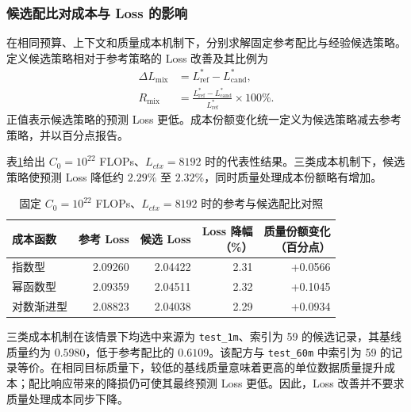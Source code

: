 \documentclass[bwprint]{gmcmthesis}
\numberwithin{equation}{section}
\numberwithin{figure}{section}
\numberwithin{table}{section}
\begin{document}
        \subsubsection{候选配比对成本与 Loss 的影响}

        在相同预算、上下文和质量成本机制下，分别求解固定参考配比与经验候选策略。定义候选策略相对于参考策略的 Loss 改善及其比例为
        \begin{equation}
        \begin{aligned}
        \Delta L_{\mathrm{mix}}
        &=L_{\mathrm{ref}}^*-L_{\mathrm{cand}}^*,\\
        R_{\mathrm{mix}}
        &=\frac{L_{\mathrm{ref}}^*-L_{\mathrm{cand}}^*}{L_{\mathrm{ref}}^*}\times100\%.
        \end{aligned}
        \label{eq:p3_mixture_improvement}
        \end{equation}
        正值表示候选策略的预测 Loss 更低。成本份额变化统一定义为候选策略减去参考策略，并以百分点报告。

        表\ref{tab:p3_mixture_comparison}给出 $C_0=10^{22}$ FLOPs、$L_{ctx}=8192$ 时的代表性结果。三类成本机制下，候选策略使预测 Loss 降低约 $2.29\%$ 至 $2.32\%$，同时质量处理成本份额略有增加。

        \begin{table}[htbp]
        \centering
        \small
        \caption{固定 $C_0=10^{22}$ FLOPs、$L_{ctx}=8192$ 时的参考与候选配比对照}
        \label{tab:p3_mixture_comparison}
        \begin{tabular}{lrrrr}
        \toprule
        成本函数 & 参考 Loss & 候选 Loss & \shortstack{Loss 降幅\\（\%）} & \shortstack{质量份额变化\\（百分点）} \\
        \midrule
        指数型 & 2.09260 & 2.04422 & 2.31 & +0.0566 \\
        幂函数型 & 2.09359 & 2.04511 & 2.32 & +0.1045 \\
        对数渐进型 & 2.08823 & 2.04038 & 2.29 & +0.0934 \\
        \bottomrule
        \end{tabular}
        \end{table}

        三类成本机制在该情景下均选中来源为 \texttt{test\_1m}、索引为 59 的候选记录，其基线质量约为 $0.5980$，低于参考配比的 $0.6109$。该配方与 \texttt{test\_60m} 中索引为 59 的记录等价。在相同目标质量下，较低的基线质量意味着更高的单位数据质量提升成本；配比响应带来的降损仍可使其最终预测 Loss 更低。因此，Loss 改善并不要求质量处理成本同步下降。
\end{document}
